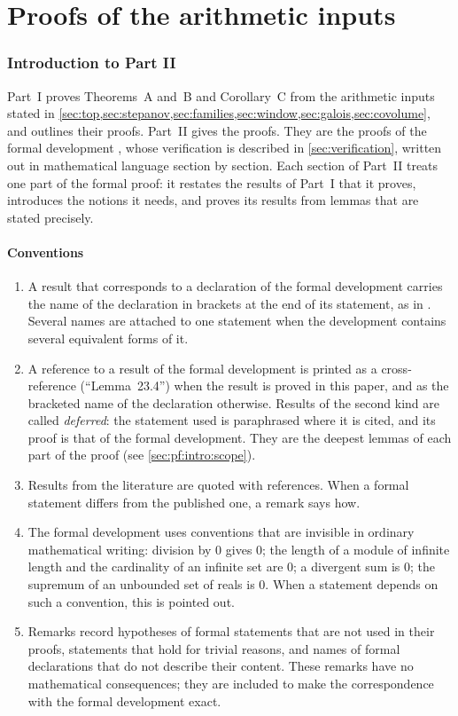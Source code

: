 \part{Proofs of the arithmetic inputs}\label{part:proofs}

\section{Introduction to Part II}\label{sec:pf:intro}

Part~I proves Theorems~A and~B and Corollary~C from the arithmetic inputs stated in
\cref{sec:top,sec:stepanov,sec:families,sec:window,sec:galois,sec:covolume}, and outlines their proofs.
Part~II gives the proofs. They are the proofs of the formal development \cite{LeanSource2026}, whose
verification is described in \cref{sec:verification}, written out in mathematical language section by section.
Each section of Part~II treats one part of the formal proof: it restates the results of Part~I that it
proves, introduces the notions it needs, and proves its results from lemmas that are stated precisely.

\subsection{Conventions}\label{sec:pf:intro:conv}
\begin{enumerate}[label=(\arabic*)]
\item A result that corresponds to a declaration of the formal development carries the name of the
declaration in brackets at the end of its statement, as in .
Several names are attached to one statement when the development contains several equivalent forms of it.
\item A reference to a result of the formal development is printed as a cross-reference (``Lemma~23.4'')
when the result is proved in this paper, and as the bracketed name of the declaration otherwise. Results of
the second kind are called \emph{deferred}: the statement used is paraphrased where it is cited, and its
proof is that of the formal development. They are the deepest lemmas of each part of the proof (see
\cref{sec:pf:intro:scope}).
\item Results from the literature are quoted with references. When a formal statement differs from the
published one, a remark says how.
\item The formal development uses conventions that are invisible in ordinary mathematical writing: division
by $0$ gives $0$; the length of a module of infinite length and the cardinality of an infinite set are $0$;
a divergent sum is $0$; the supremum of an unbounded set of reals is $0$. When a statement depends on such a
convention, this is pointed out.
\item Remarks record hypotheses of formal statements that are not used in their proofs, statements that hold
for trivial reasons, and names of formal declarations that do not describe their content. These remarks
have no mathematical consequences; they are included to make the correspondence with the formal
development exact.
\end{enumerate}

